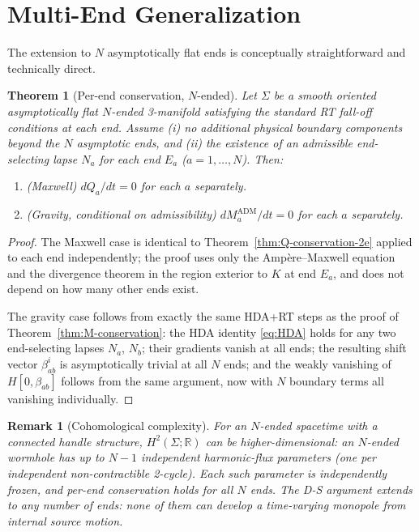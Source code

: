 \documentclass[aps,prd,onecolumn,nofootinbib,superscriptaddress]{revtex4-2}
\newtheorem{theorem}{Theorem}
\newtheorem{remark}{Remark}
\begin{document}
\section{Multi-End Generalization}
\label{sec:multiend}

The extension to $N$ asymptotically flat ends is conceptually straightforward
and technically direct.

\begin{theorem}[Per-end conservation, $N$-ended]
\label{thm:N-ended}
Let $\Sigma$ be a smooth oriented asymptotically flat $N$-ended 3-manifold
satisfying the standard RT fall-off conditions at each end.  Assume (i) no
additional physical boundary components beyond the $N$ asymptotic ends, and
(ii) the existence of an admissible end-selecting lapse $N_a$ for each end
$E_a$ ($a=1,\ldots,N$).  Then:
\begin{enumerate}
  \item (Maxwell) $dQ_a/dt=0$ for each $a$ separately.
  \item (Gravity, conditional on admissibility) $dM_a^{\mathrm{ADM}}/dt=0$
    for each $a$ separately.
\end{enumerate}
\end{theorem}

\begin{proof}
The Maxwell case is identical to Theorem~\ref{thm:Q-conservation-2e} applied
to each end independently; the proof uses only the Amp\`ere--Maxwell equation
and the divergence theorem in the region exterior to $K$ at end $E_a$, and
does not depend on how many other ends exist.

The gravity case follows from exactly the same HDA+RT steps as the proof of
Theorem~\ref{thm:M-conservation}: the HDA identity \eqref{eq:HDA} holds for
any two end-selecting lapses $N_a$, $N_b$; their gradients vanish at all ends;
the resulting shift vector $\beta_{ab}^i$ is asymptotically trivial at all $N$
ends; and the weakly vanishing of $H[0,\beta_{ab}]$ follows from the same
argument, now with $N$ boundary terms all vanishing individually.
\end{proof}

\begin{remark}[Cohomological complexity]
For an $N$-ended spacetime with a connected handle structure, $H^2(\Sigma;\mathbb{R})$
can be higher-dimensional: an $N$-ended wormhole has up to $N-1$ independent
harmonic-flux parameters (one per independent non-contractible 2-cycle).  Each
such parameter is independently frozen, and per-end conservation holds for all
$N$ ends.  The D-S argument extends to any number of ends: none of them can
develop a time-varying monopole from internal source motion.
\end{remark}
\end{document}
